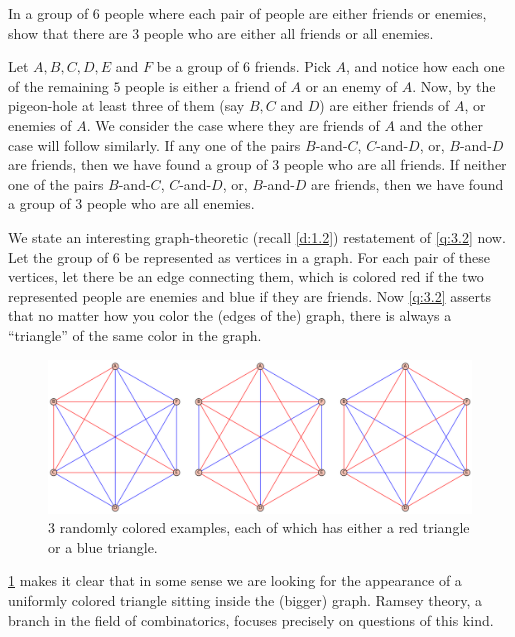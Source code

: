 \begin{question}
In a group of $6$ people where each pair of people are either friends or enemies, show that there are $3$ people who are either all friends or all enemies. 
\label{q:3.2}
\end{question}
\begin{solution}
Let $A,B,C,D,E$ and $F$ be a group of $6$ friends. Pick $A$, and notice how each one of the remaining $5$ people is either a friend of $A$ or an enemy of $A$. Now, by the pigeon-hole at least three of them (say $B,C$ and $D$) are either friends of $A$, or enemies of $A$. We consider the case where they are friends of $A$ and the other case will follow similarly. If any one of the pairs $B$-and-$C$, $C$-and-$D$, or, $B$-and-$D$ are friends, then we have found a group of $3$ people who are all friends. If neither one of the pairs $B$-and-$C$, $C$-and-$D$, or, $B$-and-$D$ are friends, then we have found a group of $3$ people who are all enemies.
\end{solution}
We state an interesting graph-theoretic (recall \cref{d:1.2}) restatement of \cref{q:3.2} now. Let the group of $6$ be represented as vertices in a graph. For each pair of these vertices, let there be an edge connecting them, which is colored red if the two represented people are enemies and blue if they are friends. Now \cref{q:3.2} asserts that no matter how you color the (edges of the) graph, there is always a ``triangle'' of the same color in the graph. 
\begin{figure}[H]
    \centering
    \includegraphics[width=0.9\linewidth]{Images/Figure10.png}
    \caption{3 randomly colored examples, each of which has either a red triangle or a blue triangle.}
    \label{f:10}
\end{figure}
\begin{remark}
\cref{f:10} makes it clear that in some sense we are looking for the appearance of a uniformly colored triangle sitting inside the (bigger) graph. Ramsey theory, a branch in the field of combinatorics, focuses precisely on questions of this kind.
\end{remark}
